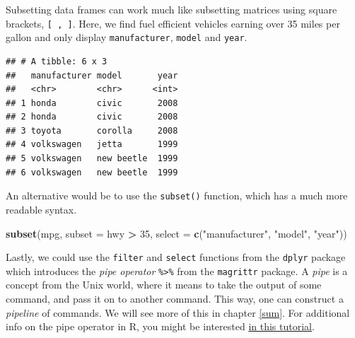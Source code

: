 \documentclass[]{book}
\newenvironment{Shaded}{\begin{snugshade}}{\end{snugshade}}
\newcommand{\KeywordTok}[1]{\textcolor[rgb]{0.13,0.29,0.53}{\textbf{#1}}}
\newcommand{\DataTypeTok}[1]{\textcolor[rgb]{0.13,0.29,0.53}{#1}}
\newcommand{\DecValTok}[1]{\textcolor[rgb]{0.00,0.00,0.81}{#1}}
\newcommand{\StringTok}[1]{\textcolor[rgb]{0.31,0.60,0.02}{#1}}
\newcommand{\CommentTok}[1]{\textcolor[rgb]{0.56,0.35,0.01}{\textit{#1}}}
\newcommand{\OperatorTok}[1]{\textcolor[rgb]{0.81,0.36,0.00}{\textbf{#1}}}
\newcommand{\NormalTok}[1]{#1}
\theoremstyle{definition}
\theoremstyle{definition}
\theoremstyle{definition}
\theoremstyle{remark}
\begin{document}
Subsetting data frames can work much like subsetting matrices using
square brackets, \texttt{{[}\ ,\ {]}}. Here, we find fuel efficient
vehicles earning over 35 miles per gallon and only display
\texttt{manufacturer}, \texttt{model} and \texttt{year}.

\begin{Shaded}
\end{Shaded}

\begin{verbatim}
## # A tibble: 6 x 3
##   manufacturer model       year
##   <chr>        <chr>      <int>
## 1 honda        civic       2008
## 2 honda        civic       2008
## 3 toyota       corolla     2008
## 4 volkswagen   jetta       1999
## 5 volkswagen   new beetle  1999
## 6 volkswagen   new beetle  1999
\end{verbatim}

An alternative would be to use the \texttt{subset()} function, which has
a much more readable syntax.

\begin{Shaded}
\begin{Highlighting}[]
\KeywordTok{subset}\NormalTok{(mpg, }\DataTypeTok{subset =}\NormalTok{ hwy }\OperatorTok{>}\StringTok{ }\DecValTok{35}\NormalTok{, }\DataTypeTok{select =} \KeywordTok{c}\NormalTok{(}\StringTok{"manufacturer"}\NormalTok{, }\StringTok{"model"}\NormalTok{, }\StringTok{"year"}\NormalTok{))}
\end{Highlighting}
\end{Shaded}

Lastly, we could use the \texttt{filter} and \texttt{select} functions
from the \texttt{dplyr} package which introduces the \emph{pipe
operator} \texttt{\%\textgreater{}\%} from the \texttt{magrittr}
package. A \emph{pipe} is a concept from the Unix world, where it means
to take the output of some command, and pass it on to another command.
This way, one can construct a \emph{pipeline} of commands. We will see
more of this in chapter \ref{sum}. For additional info on the pipe
operator in R, you might be interested
\href{https://www.datacamp.com/community/tutorials/pipe-r-tutorial}{in
this tutorial}.
\end{document}
